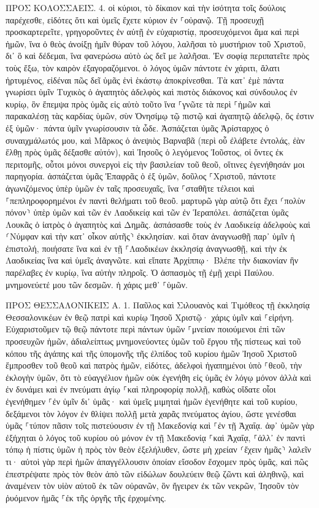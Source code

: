 \documentclass[twoside, 9pt]{extreport}
\begin{document}
ΠΡΟΣ ΚΟΛΟΣΣΑΕΙΣ.
4.
οἱ κύριοι, τὸ δίκαιον καὶ τὴν ἰσότητα τοῖς δούλοις παρέχεσθε, εἰδότες ὅτι καὶ ὑμεῖς ἔχετε κύριον ἐν ⸀οὐρανῷ. 
Τῇ προσευχῇ προσκαρτερεῖτε, γρηγοροῦντες ἐν αὐτῇ ἐν εὐχαριστίᾳ, 
προσευχόμενοι ἅμα καὶ περὶ ἡμῶν, ἵνα ὁ θεὸς ἀνοίξῃ ἡμῖν θύραν τοῦ λόγου, λαλῆσαι τὸ μυστήριον τοῦ Χριστοῦ, δι᾽ ὃ καὶ δέδεμαι, 
ἵνα φανερώσω αὐτὸ ὡς δεῖ με λαλῆσαι. 
Ἐν σοφίᾳ περιπατεῖτε πρὸς τοὺς ἔξω, τὸν καιρὸν ἐξαγοραζόμενοι. 
ὁ λόγος ὑμῶν πάντοτε ἐν χάριτι, ἅλατι ἠρτυμένος, εἰδέναι πῶς δεῖ ὑμᾶς ἑνὶ ἑκάστῳ ἀποκρίνεσθαι. 
Τὰ κατ᾽ ἐμὲ πάντα γνωρίσει ὑμῖν Τυχικὸς ὁ ἀγαπητὸς ἀδελφὸς καὶ πιστὸς διάκονος καὶ σύνδουλος ἐν κυρίῳ, 
ὃν ἔπεμψα πρὸς ὑμᾶς εἰς αὐτὸ τοῦτο ἵνα ⸀γνῶτε τὰ περὶ ⸀ἡμῶν καὶ παρακαλέσῃ τὰς καρδίας ὑμῶν, 
σὺν Ὀνησίμῳ τῷ πιστῷ καὶ ἀγαπητῷ ἀδελφῷ, ὅς ἐστιν ἐξ ὑμῶν· πάντα ὑμῖν γνωρίσουσιν τὰ ὧδε. 
Ἀσπάζεται ὑμᾶς Ἀρίσταρχος ὁ συναιχμάλωτός μου, καὶ Μᾶρκος ὁ ἀνεψιὸς Βαρναβᾶ (περὶ οὗ ἐλάβετε ἐντολάς, ἐὰν ἔλθῃ πρὸς ὑμᾶς δέξασθε αὐτόν), 
καὶ Ἰησοῦς ὁ λεγόμενος Ἰοῦστος, οἱ ὄντες ἐκ περιτομῆς, οὗτοι μόνοι συνεργοὶ εἰς τὴν βασιλείαν τοῦ θεοῦ, οἵτινες ἐγενήθησάν μοι παρηγορία. 
ἀσπάζεται ὑμᾶς Ἐπαφρᾶς ὁ ἐξ ὑμῶν, δοῦλος ⸀Χριστοῦ, πάντοτε ἀγωνιζόμενος ὑπὲρ ὑμῶν ἐν ταῖς προσευχαῖς, ἵνα ⸀σταθῆτε τέλειοι καὶ ⸀πεπληροφορημένοι ἐν παντὶ θελήματι τοῦ θεοῦ. 
μαρτυρῶ γὰρ αὐτῷ ὅτι ἔχει ⸂πολὺν πόνον⸃ ὑπὲρ ὑμῶν καὶ τῶν ἐν Λαοδικείᾳ καὶ τῶν ἐν Ἱεραπόλει. 
ἀσπάζεται ὑμᾶς Λουκᾶς ὁ ἰατρὸς ὁ ἀγαπητὸς καὶ Δημᾶς. 
ἀσπάσασθε τοὺς ἐν Λαοδικείᾳ ἀδελφοὺς καὶ ⸂Νύμφαν καὶ τὴν κατ᾽ οἶκον αὐτῆς⸃ ἐκκλησίαν. 
καὶ ὅταν ἀναγνωσθῇ παρ᾽ ὑμῖν ἡ ἐπιστολή, ποιήσατε ἵνα καὶ ἐν τῇ ⸀Λαοδικέων ἐκκλησίᾳ ἀναγνωσθῇ, καὶ τὴν ἐκ Λαοδικείας ἵνα καὶ ὑμεῖς ἀναγνῶτε. 
καὶ εἴπατε Ἀρχίππῳ· Βλέπε τὴν διακονίαν ἣν παρέλαβες ἐν κυρίῳ, ἵνα αὐτὴν πληροῖς. 
Ὁ ἀσπασμὸς τῇ ἐμῇ χειρὶ Παύλου. μνημονεύετέ μου τῶν δεσμῶν. ἡ χάρις μεθ᾽ ⸀ὑμῶν. 

ΠΡΟΣ ΘΕΣΣΑΛΟΝΙΚΕΙΣ Α.
1.
Παῦλος καὶ Σιλουανὸς καὶ Τιμόθεος τῇ ἐκκλησίᾳ Θεσσαλονικέων ἐν θεῷ πατρὶ καὶ κυρίῳ Ἰησοῦ Χριστῷ· χάρις ὑμῖν καὶ ⸀εἰρήνη. 
Εὐχαριστοῦμεν τῷ θεῷ πάντοτε περὶ πάντων ὑμῶν ⸀μνείαν ποιούμενοι ἐπὶ τῶν προσευχῶν ἡμῶν, ἀδιαλείπτως 
μνημονεύοντες ὑμῶν τοῦ ἔργου τῆς πίστεως καὶ τοῦ κόπου τῆς ἀγάπης καὶ τῆς ὑπομονῆς τῆς ἐλπίδος τοῦ κυρίου ἡμῶν Ἰησοῦ Χριστοῦ ἔμπροσθεν τοῦ θεοῦ καὶ πατρὸς ἡμῶν, 
εἰδότες, ἀδελφοὶ ἠγαπημένοι ὑπὸ ⸀θεοῦ, τὴν ἐκλογὴν ὑμῶν, 
ὅτι τὸ εὐαγγέλιον ἡμῶν οὐκ ἐγενήθη εἰς ὑμᾶς ἐν λόγῳ μόνον ἀλλὰ καὶ ἐν δυνάμει καὶ ἐν πνεύματι ἁγίῳ ⸀καὶ πληροφορίᾳ πολλῇ, καθὼς οἴδατε οἷοι ἐγενήθημεν ⸀ἐν ὑμῖν δι᾽ ὑμᾶς· 
καὶ ὑμεῖς μιμηταὶ ἡμῶν ἐγενήθητε καὶ τοῦ κυρίου, δεξάμενοι τὸν λόγον ἐν θλίψει πολλῇ μετὰ χαρᾶς πνεύματος ἁγίου, 
ὥστε γενέσθαι ὑμᾶς ⸀τύπον πᾶσιν τοῖς πιστεύουσιν ἐν τῇ Μακεδονίᾳ καὶ ⸀ἐν τῇ Ἀχαΐᾳ. 
ἀφ᾽ ὑμῶν γὰρ ἐξήχηται ὁ λόγος τοῦ κυρίου οὐ μόνον ἐν τῇ Μακεδονίᾳ ⸀καὶ Ἀχαΐᾳ, ⸀ἀλλ᾽ ἐν παντὶ τόπῳ ἡ πίστις ὑμῶν ἡ πρὸς τὸν θεὸν ἐξελήλυθεν, ὥστε μὴ χρείαν ⸂ἔχειν ἡμᾶς⸃ λαλεῖν τι· 
αὐτοὶ γὰρ περὶ ἡμῶν ἀπαγγέλλουσιν ὁποίαν εἴσοδον ἔσχομεν πρὸς ὑμᾶς, καὶ πῶς ἐπεστρέψατε πρὸς τὸν θεὸν ἀπὸ τῶν εἰδώλων δουλεύειν θεῷ ζῶντι καὶ ἀληθινῷ, 
καὶ ἀναμένειν τὸν υἱὸν αὐτοῦ ἐκ τῶν οὐρανῶν, ὃν ἤγειρεν ἐκ τῶν νεκρῶν, Ἰησοῦν τὸν ῥυόμενον ἡμᾶς ⸀ἐκ τῆς ὀργῆς τῆς ἐρχομένης. 
\end{document}
